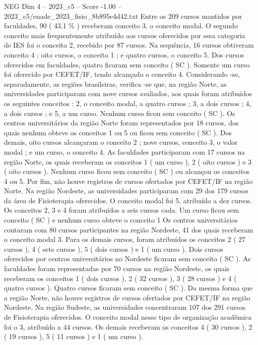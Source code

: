 \begin{textsample}{NEG Dim 4 – 2023\_c5 – Score -1.00 – 2023\_c5/enade\_2023\_fisio\_8b895e4d42.txt}
Entre os 209 cursos mantidos por faculdades, 90 ( 43,1 \% ) receberam conceito 3, o conceito modal.
O segundo conceito mais frequentemente atribuído aos cursos oferecidos por essa categoria de IES foi o conceito 2, recebido por 87 cursos.
Na sequência, 16 cursos obtiveram conceito 4 ; oito cursos, o conceito 1 ; e quatro cursos, o conceito 5.
Dos cursos oferecidos em faculdades, quatro ficaram sem conceito ( SC ).
Somente um curso foi oferecido por CEFET/IF, tendo alcançado o conceito 4.
Considerando -se, separadamente, as regiões brasileiras, verifica -se que, na região Norte, as universidades participaram com nove cursos avaliados, aos quais foram atribuídos os seguintes conceitos : 2, o conceito modal, a quatro cursos ; 3, a dois cursos ; 4, a dois cursos ; e 5, a um curso.
Nenhum curso ficou sem conceito ( SC ).
Os centros universitários da região Norte foram representados por 18 cursos, dos quais nenhum obteve os conceitos 1 ou 5 ou ficou sem conceito ( SC ).
Dos demais, oito cursos alcançaram o conceito 2 ; nove cursos, conceito 3, o valor modal ; e um curso, o conceito 4.
As faculdades participaram com 17 cursos na região Norte, os quais receberam os conceitos 1 ( um curso ), 2 ( oito cursos ) e 3 ( oito cursos ).
Nenhum curso ficou sem conceito ( SC ) ou alcançou os conceitos 4 ou 5.
Por fim, não houve registros de cursos ofertados por CEFET/IF na região Norte.
Na região Nordeste, as universidades participaram com 29 dos 179 cursos da área de Fisioterapia oferecidos.
O conceito modal foi 5, atribuído a dez cursos.
Os conceitos 2, 3 e 4 foram atribuídos a seis cursos cada.
Um curso ficou sem conceito ( SC ) e nenhum curso obteve o conceito 1 Os centros universitários contaram com 80 cursos participantes na região Nordeste, 41 dos quais receberam o conceito modal 3.
Para os demais cursos, foram atribuídos os conceitos 2 ( 27 cursos ), 4 ( sete cursos ), 5 ( dois cursos ) e 1 ( um curso ).
Dois cursos oferecidos por centros universitários no Nordeste ficaram sem conceito ( SC ).
As faculdades foram representadas por 70 cursos na região Nordeste, os quais receberam os conceitos 1 ( dois cursos ), 2 ( 32 cursos ), 3 ( 28 cursos ) e 4 ( quatro cursos ).
Quatro cursos ficaram sem conceito ( SC ).
Da mesma forma que a região Norte, não houve registros de cursos ofertados por CEFET/IF na região Nordeste.
Na região Sudeste, as universidades concentraram 107 dos 291 cursos de Fisioterapia oferecidos.
O conceito modal nesse tipo de organização acadêmica foi o 3, atribuído a 44 cursos.
Os demais receberam os conceitos 4 ( 30 cursos ), 2 ( 19 cursos ), 5 ( 11 cursos ) e 1 ( um curso ).

\end{textsample}
